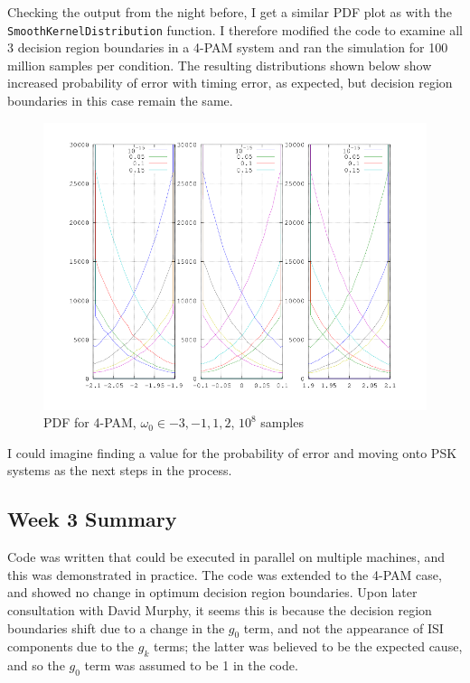 Checking the output from the night before, I get a similar PDF plot as
with the \texttt{SmoothKernelDistribution} function. I therefore
modified the code to examine all 3 decision region boundaries in a 4-PAM
system and ran the simulation for 100 million samples per condition. The
resulting distributions shown below show increased probability of error
with timing error, as expected, but decision region boundaries in this
case remain the same.

\begin{figure}[htbp]
\centering
\includegraphics[width=\linewidth]{../../../plots/4pamdecision.png}
\caption{PDF for 4-PAM, $\omega_0 \in {-3,-1,1,2}$, $10^8$ samples}
\end{figure}

I could imagine finding a value for the probability of error and moving
onto PSK systems as the next steps in the process.

\subsection{Week 3 Summary}

Code was written that could be executed in parallel on multiple
machines, and this was demonstrated in practice. The code was extended
to the 4-PAM case, and showed no change in optimum decision region
boundaries. Upon later consultation with David Murphy, it seems this is because
the decision region boundaries shift due to a change in the $g_0$ term,
and not the appearance of ISI components due to the $g_k$ terms; the
latter was believed to be the expected cause, and so the $g_0$ term was
assumed to be 1 in the code.

